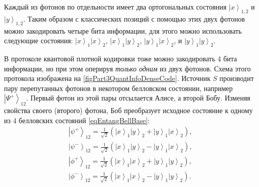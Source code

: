 Каждый из фотонов по отдельности имеет два ортогональных состояния 
$\left|x\right>_{1,2}$ и $\left|y\right>_{1,2}$. Таким образом с
классических позиций с помощью этих двух фотонов можно закодировать
четыре бита информации, для этого можно использовать следующие
состояния:
$\left|x\right>_1 \left|x\right>_2$,
$\left|x\right>_1 \left|y\right>_2$,
$\left|y\right>_1 \left|x\right>_2$,
и 
$\left|y\right>_1 \left|y\right>_2$.



В протоколе квантовой плотной кодировки тоже можно закодировать 4
бита информации, но при этом оперируя {\it только одним} из двух 
фотонов. Схема этого протокола изображена на
\autoref{figPart3QuantInfoDenseCode}. Источник $S$ производит пару
перепутанных фотонов в некотором белловском состоянии, например
$\left|\Psi^{+}\right>_{12}$.  Первый фотон из этой пары отсылается Алисе,
а второй Бобу. Изменяя свойства своего (второго) фотона, Боб
преобразует исходное состояние к одному из 4 белловских состояний \eqref{eqEntangBellBase}:
\begin{eqnarray}
  \left|\psi^{+}\right>_{12} = 
  \frac{1}{\sqrt{2}}\left(
  \left|x\right>_1\left|y\right>_2 + 
  \left|y\right>_1\left|x\right>_2
  \right),
  \nonumber \\
  \left|\psi^{-}\right>_{12} = 
  \frac{1}{\sqrt{2}}\left(
  \left|x\right>_1\left|y\right>_2 - 
  \left|y\right>_1\left|x\right>_2
  \right),
  \nonumber \\
  \left|\phi^{+}\right>_{12} = 
  \frac{1}{\sqrt{2}}\left(
  \left|x\right>_1\left|x\right>_2 + 
  \left|y\right>_1\left|y\right>_2
  \right),
  \nonumber \\
  \left|\phi^{-}\right>_{12} = 
  \frac{1}{\sqrt{2}}\left(
  \left|x\right>_1\left|x\right>_2 - 
  \left|y\right>_1\left|y\right>_2
  \right).
  \label{eqQuantInfoBellBase}
\end{eqnarray}

